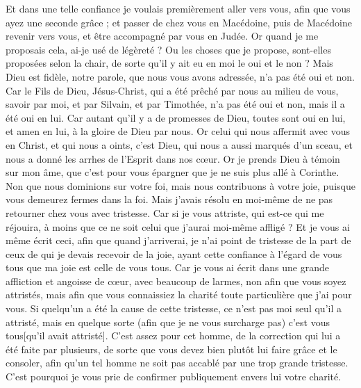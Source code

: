 \begin{multicols}{2}
Et dans une telle confiance je voulais premièrement aller vers vous, afin que vous ayez une seconde grâce ;
et passer de chez vous en Macédoine, puis de Macédoine revenir vers vous, et être accompagné par vous en Judée.
Or quand je me proposais cela, ai-je usé de légèreté ? Ou les choses que je propose, sont-elles proposées selon la chair, de sorte qu'il y ait eu en moi le oui et le non ?
Mais Dieu est fidèle, notre parole, que nous vous avons adressée, n’a pas été oui et non.
Car le Fils de Dieu, Jésus-Christ, qui a été prêché par nous au milieu de vous, savoir par moi, et par Silvain, et par Timothée, n'a pas été oui et non, mais il a été oui en lui.
Car autant qu’il y a de promesses de Dieu, toutes sont oui en lui, et amen en lui, à la gloire de Dieu par nous.
Or celui qui nous affermit avec vous en Christ, et qui nous a oints, c'est Dieu,
qui nous a aussi marqués d’un sceau, et nous a donné les arrhes de l'Esprit dans nos cœur.
Or je prends Dieu à témoin sur mon âme, que c’est pour vous épargner que je ne suis plus allé à Corinthe.
Non que nous dominions sur votre foi, mais nous contribuons à votre joie, puisque vous demeurez fermes dans la foi.
\VerseOne{}Mais j'avais résolu en moi-même de ne pas retourner chez vous avec tristesse.
Car si je vous attriste, qui est-ce qui me réjouira, à moins que ce ne soit celui que j'aurai moi-même affligé ?
Et je vous ai même écrit ceci, afin que quand j'arriverai, je n'ai point de tristesse de la part de ceux de qui je devais recevoir de la joie, ayant cette confiance à l'égard de vous tous que ma joie est celle de vous tous.
Car je vous ai écrit dans une grande affliction et angoisse de cœur, avec beaucoup de larmes, non afin que vous soyez attristés, mais afin que vous connaissiez la charité toute particulière que j'ai pour vous.
Si quelqu'un a été la cause de cette tristesse, ce n'est pas moi seul qu'il a attristé, mais en quelque sorte (afin que je ne vous surcharge pas) c'est vous tous[qu'il avait attristé].
C'est assez pour cet homme, de la correction qui lui a été faite par plusieurs,
de sorte que vous devez bien plutôt lui faire grâce et le consoler, afin qu'un tel homme ne soit pas accablé par une trop grande tristesse.
C'est pourquoi je vous prie de confirmer publiquement envers lui votre charité.

\end{multicols}

